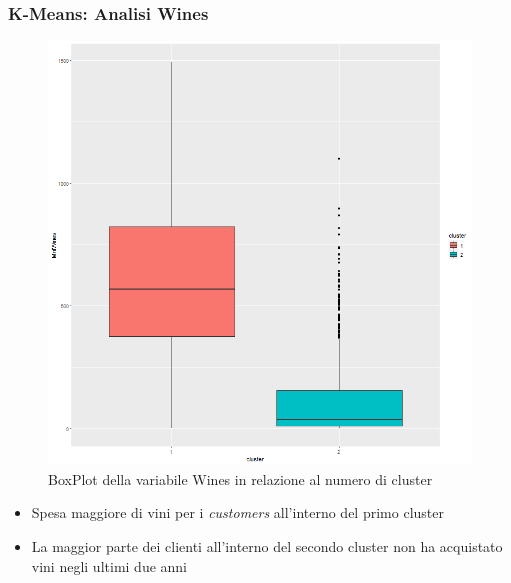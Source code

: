 \begin{frame}[fragile]
\frametitle{K-Means: Analisi Wines}
\begin{minipage}{0.45\textwidth}
\begin{figure}[H]
        \centering
     \includegraphics[width=0.8\linewidth]{Img/KMEANS009.png}
      \caption{BoxPlot della variabile Wines in relazione al numero di cluster}
    \label{fig:winesKmeansBoxPlot}
\end{figure}
\end{minipage}%
\hspace{2em}
\begin{minipage}{0.45\textwidth}
\begin{itemize}
    \item Spesa maggiore di vini per i \textit{customers} all'interno del primo cluster
    \item La maggior parte dei clienti all'interno del secondo cluster non ha acquistato vini negli ultimi due anni
\end{itemize}
\end{minipage}%
\end{frame}
